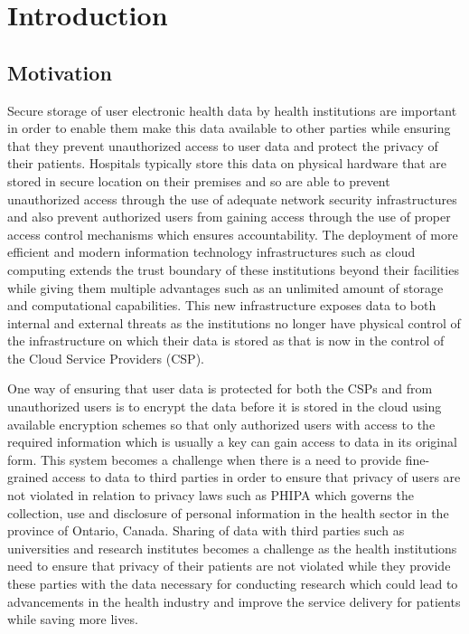 \chapter{Introduction}
\label{chap:introduction}

\section{Motivation}

Secure storage of user electronic health data by health institutions are important in order to enable them make this data available to other parties while ensuring that they prevent unauthorized access to user data and protect the privacy of their patients. Hospitals typically store this data on physical hardware that are stored in secure location on their premises and so are able to prevent unauthorized access through the use of adequate network security infrastructures and also prevent authorized users from gaining access through the use of proper access control mechanisms which ensures accountability. The deployment of more efficient and modern information technology infrastructures such as cloud computing extends the trust boundary of these institutions beyond their facilities while giving them multiple advantages such as an unlimited amount of storage and computational capabilities. This new infrastructure exposes data to both internal and external threats as the institutions no longer have physical control of the infrastructure on which their data is stored as that is now in the control of the Cloud Service Providers (CSP).
 
One way of ensuring that user data is protected for both the CSPs and from unauthorized users is to encrypt the data before it is stored in the cloud using available encryption schemes so that only authorized users with access to the required information which is usually a key can gain access to data in its original form. This system becomes a challenge when there is a need to provide fine-grained access to data to third parties in order to ensure that privacy of users are not violated in relation to privacy laws such as PHIPA \cite{pihipa} which governs the collection, use and disclosure of personal information in the health sector in the province of Ontario, Canada. Sharing of data with third parties such as universities and research institutes becomes a challenge as the health institutions need to ensure that privacy of their patients are not violated while they provide these parties with the data necessary for conducting research which could lead to advancements in the health industry and improve the service delivery for patients while saving more lives.

